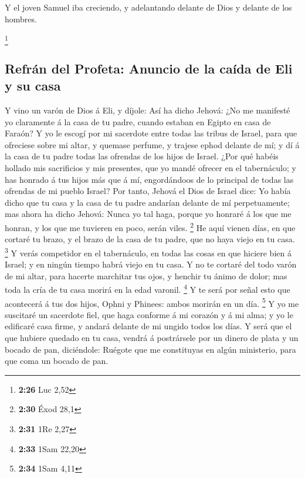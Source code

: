  Y el joven Samuel iba creciendo, y adelantando delante
de Dios y delante de los hombres.

\footnote{\textbf{2:26} Luc 2,52}

\hypertarget{refruxe1n-del-profeta-anuncio-de-la-cauxedda-de-eli-y-su-casa}{%
\subsection{Refrán del Profeta: Anuncio de la caída de Eli y su
casa}\label{refruxe1n-del-profeta-anuncio-de-la-cauxedda-de-eli-y-su-casa}}

 Y vino un varón de Dios á Eli, y díjole: Así ha dicho
Jehová: ¿No me manifesté yo claramente á la casa de tu padre, cuando
estaban en Egipto en casa de Faraón?  Y yo le escogí por
mi sacerdote entre todas las tribus de Israel, para que ofreciese sobre
mi altar, y quemase perfume, y trajese ephod delante de mí; y dí á la
casa de tu padre todas las ofrendas de los hijos de Israel.
 ¿Por qué habéis hollado mis sacrificios y mis presentes,
que yo mandé ofrecer en el tabernáculo; y has honrado á tus hijos más
que á mí, engordándoos de lo principal de todas las ofrendas de mi
pueblo Israel?  Por tanto, Jehová el Dios de Israel dice:
Yo había dicho que tu casa y la casa de tu padre andarían delante de mí
perpetuamente; mas ahora ha dicho Jehová: Nunca yo tal haga, porque yo
honraré á los que me honran, y los que me tuvieren en poco, serán viles.
\footnote{\textbf{2:30} Éxod 28,1}  He aquí vienen días,
en que cortaré tu brazo, y el brazo de la casa de tu padre, que no haya
viejo en tu casa. \footnote{\textbf{2:31} 1Re 2,27}  Y
verás competidor en el tabernáculo, en todas las cosas en que hiciere
bien á Israel; y en ningún tiempo habrá viejo en tu casa.
 Y no te cortaré del todo varón de mi altar, para hacerte
marchitar tus ojos, y henchir tu ánimo de dolor; mas toda la cría de tu
casa morirá en la edad varonil. \footnote{\textbf{2:33} 1Sam 22,20}
 Y te será por señal esto que acontecerá á tus dos hijos,
Ophni y Phinees: ambos morirán en un día. \footnote{\textbf{2:34} 1Sam
  4,11}  Y yo me suscitaré un sacerdote fiel, que haga
conforme á mi corazón y á mi alma; y yo le edificaré casa firme, y
andará delante de mi ungido todos los días.  Y será que
el que hubiere quedado en tu casa, vendrá á postrársele por un dinero de
plata y un bocado de pan, diciéndole: Ruégote que me constituyas en
algún ministerio, para que coma un bocado de pan.

